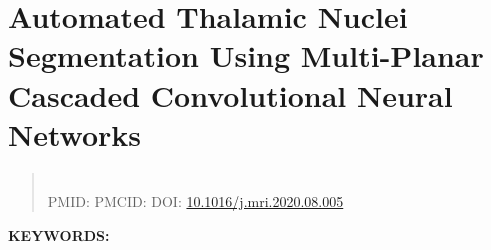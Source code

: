 \renewcommand{\figurepath}[1]{Chapters/thalamus/figures/#1}

\chapter{Automated Thalamic Nuclei Segmentation Using Multi-Planar Cascaded Convolutional Neural Networks}\label{ch:thalamus}

\begin{quotation}
    \centering
     \\
    PMID\@: {\color{blue}{32828985}}  PMCID\@: {\color{blue}{PMC7530079}} DOI\@: \href{https://doi.org/10.1016/j.mri.2020.08.005}{10.1016/j.mri.2020.08.005}
\end{quotation}

%

\textbf{KEYWORDS:\ } %

\newpage


